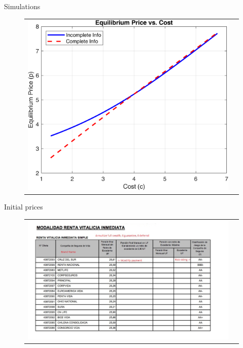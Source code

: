 \documentclass[10pt,aspectratio=169]{beamer}
\begin{document}
\begin{frame}{Simulations }
\begin{figure}[H]
\centering{}%
\begin{tabular}{cc}
\includegraphics[scale=0.7]{../figures/simulations/model5/pricesCI_IC.png}
\end{tabular}
\end{figure}
\end{frame}



\begin{frame}{Initial prices}\label{slide:fig_offer_certificate}    
\begin{figure}[H]
\centering{}%
\begin{tabular}{cc}
\includegraphics[scale=0.49]{../figures/annuity_offer.png}
\end{tabular}
\end{figure}
\hyperlink{slide:setting2}{} 
\hyperlink{slide:data}{}
\end{frame}
\end{document}
